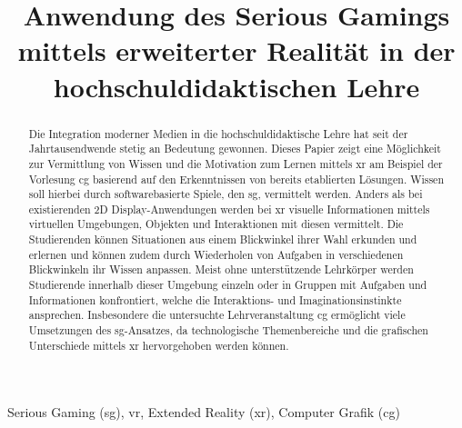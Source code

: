 \documentclass[conference]{IEEEtran}
\begin{document}
\title{Anwendung des Serious Gamings mittels erweiterter Realität in der hochschuldidaktischen Lehre\\
}


\author{
}

\maketitle

\begin{abstract}
Die Integration moderner Medien in die hochschuldidaktische Lehre hat seit der Jahrtausendwende stetig an Bedeutung gewonnen.
Dieses Papier zeigt eine Möglichkeit zur Vermittlung von Wissen und die Motivation zum Lernen mittels \gls{xr} am Beispiel der Vorlesung
\gls{cg} basierend auf den Erkenntnissen von bereits etablierten Lösungen.
Wissen soll hierbei durch softwarebasierte Spiele, den \gls{sg}, vermittelt werden.
Anders als bei existierenden 2D Display-Anwendungen werden bei \gls{xr} visuelle Informationen mittels virtuellen Umgebungen, Objekten und Interaktionen mit diesen vermittelt.
Die Studierenden können Situationen aus einem Blickwinkel ihrer Wahl erkunden und erlernen und können zudem durch Wiederholen von Aufgaben in verschiedenen Blickwinkeln
ihr Wissen anpassen.
Meist ohne unterstützende Lehrkörper werden Studierende innerhalb dieser Umgebung einzeln oder in Gruppen mit Aufgaben und Informationen konfrontiert,
welche die Interaktions- und Imaginationsinstinkte ansprechen.
Insbesondere die untersuchte Lehrveranstaltung \gls{cg} ermöglicht viele Umsetzungen des \gls{sg}-Ansatzes, da technologische Themenbereiche und die grafischen Unterschiede
mittels \gls{xr} hervorgehoben werden können.
\end{abstract}

\begin{IEEEkeywords}
Serious Gaming (\gls{sg}), \gls{vr}, Extended Reality (\gls{xr}), Computer Grafik (\gls{cg})
\end{IEEEkeywords}
\end{document}
